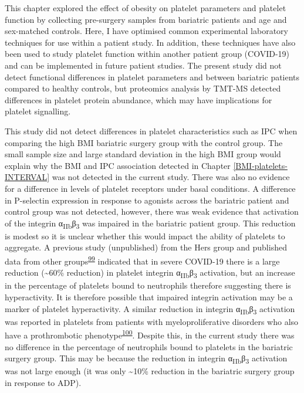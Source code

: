 \documentclass[11pt,twoside]{bristolthesis}
\begin{document}
This chapter explored the effect of obesity on platelet parameters and platelet function by collecting pre-surgery samples from bariatric patients and age and sex-matched controls. Here, I have optimised common experimental laboratory techniques for use within a patient study. In addition, these techniques have also been used to study platelet function within another patient group (COVID-19) and can be implemented in future patient studies. The present study did not detect functional differences in platelet parameters and between bariatric patients compared to healthy controls, but proteomics analysis by TMT-MS detected differences in platelet protein abundance, which may have implications for platelet signalling.

This study did not detect differences in platelet characteristics such as IPC when comparing the high BMI bariatric surgery group with the control group. The small sample size and large standard deviation in the high BMI group would explain why the BMI and IPC association detected in Chapter \ref{BMI-platelets-INTERVAL} was not detected in the current study. There was also no evidence for a difference in levels of platelet receptors under basal conditions. A difference in P-selectin expression in response to agonists across the bariatric patient and control group was not detected, however, there was weak evidence that activation of the integrin α\textsubscript{IIb}β\textsubscript{3} was impaired in the bariatric patient group. This reduction is modest so it is unclear whether this would impact the ability of platelets to aggregate. A previous study (unpublished) from the Hers group and published data from other groups\textsuperscript{\protect\hyperlink{ref-Taus2020}{99}} indicated that in severe COVID-19 there is a large reduction (\textasciitilde60\% reduction) in platelet integrin α\textsubscript{IIb}β\textsubscript{3} activation, but an increase in the percentage of platelets bound to neutrophils therefore suggesting there is hyperactivity. It is therefore possible that impaired integrin activation may be a marker of platelet hyperactivity. A similar reduction in integrin α\textsubscript{IIb}β\textsubscript{3} activation was reported in platelets from patients with myeloproliferative disorders who also have a prothrombotic phenotype\textsuperscript{\protect\hyperlink{ref-Moore2013}{100}}. Despite this, in the current study there was no difference in the percentage of neutrophils bound to platelets in the bariatric surgery group. This may be because the reduction in integrin α\textsubscript{IIb}β\textsubscript{3} activation was not large enough (it was only \textasciitilde10\% reduction in the bariatric surgery group in response to ADP).
\end{document}
